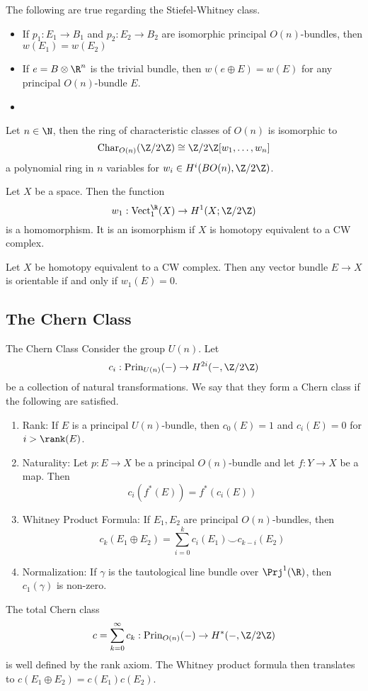 \documentclass[a4paper]{article}
\begin{document}
\begin{prp}{}{} The following are true regarding the Stiefel-Whitney class. 
\begin{itemize}
\item If $p_1:E_1\to B_1$ and $p_2:E_2\to B_2$ are isomorphic principal $O(n)$-bundles, then $w(E_1)=w(E_2)$
\item If $e=B\otimes\R^n$ is the trivial bundle, then $w(e\oplus E)=w(E)$ for any principal $O(n)$-bundle $E$. 
\item 
\end{itemize}
\end{prp}

\begin{thm}{}{} Let $n\in\N$, then the ring of characteristic classes of $O(n)$ is isomorphic to $$\text{Char}_{O(n)}(\Z/2\Z)\cong\Z/2\Z[w_1,\dots,w_n]$$ a polynomial ring in $n$ variables for $w_i\in H^i(BO(n),\Z/2\Z)$. 
\end{thm}

\begin{prp}{}{} Let $X$ be a space. Then the function $$w_1:\text{Vect}_1^\R(X)\to H^1(X;\Z/2\Z)$$ is a homomorphism. It is an isomorphism if $X$ is homotopy equivalent to a CW complex. 
\end{prp}

\begin{crl}{}{} Let $X$ be homotopy equivalent to a CW complex. Then any vector bundle $E\to X$ is orientable if and only if $w_1(E)=0$. 
\end{crl}

\subsection{The Chern Class}
\begin{defn}{The Chern Class}{} Consider the group $U(n)$. Let $$c_i:\text{Prin}_{U(n)}(-)\to H^{2i}(-,\Z/2\Z)$$ be a collection of natural transformations. We say that they form a Chern class if the following are satisfied. 
\begin{enumerate}
\item Rank: If $E$ is a principal $U(n)$-bundle, then $c_0(E)=1$ and $c_i(E)=0$ for $i>\rank(E)$. 
\item Naturality: Let $p:E\to X$ be a principal $O(n)$-bundle and let $f:Y\to X$ be a map. Then $$c_i(f^\ast(E))=f^\ast(c_i(E))$$
\item Whitney Product Formula: If $E_1,E_2$ are principal $O(n)$-bundles, then $$c_k(E_1\oplus E_2)=\sum_{i=0}^kc_i(E_1)\smile c_{k-i}(E_2)$$
\item Normalization: If $\gamma$ is the tautological line bundle over $\Prj^1(\R)$, then $c_1(\gamma)$ is non-zero. 
\end{enumerate}
The total Chern class $$c=\sum_{k=0}^\infty c_k:\text{Prin}_{O(n)}(-)\to H^\ast(-,\Z/2\Z)$$ is well defined by the rank axiom. The Whitney product formula then translates to $c(E_1\oplus E_2)=c(E_1)c(E_2)$. 
\end{defn}
\end{document}
